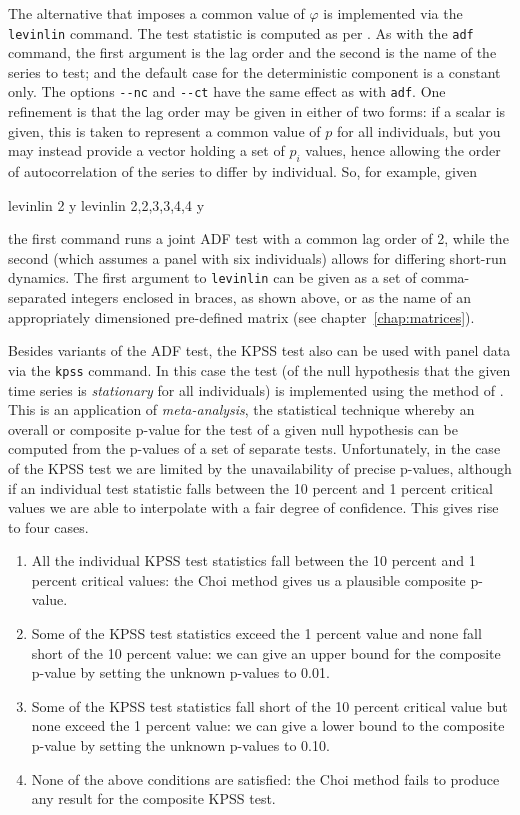The alternative that imposes a common value of $\varphi$ is
implemented via the \texttt{levinlin} command. The test statistic is
computed as per \citet*{LLC2002}.  As with the \texttt{adf} command, the
first argument is the lag order and the second is the name of the
series to test; and the default case for the deterministic component
is a constant only. The options \verb|--nc| and \verb|--ct| have the
same effect as with \texttt{adf}. One refinement is that the lag order
may be given in either of two forms: if a scalar is given, this is
taken to represent a common value of $p$ for all individuals, but you
may instead provide a vector holding a set of $p_i$ values, hence
allowing the order of autocorrelation of the series to differ by
individual. So, for example, given
\begin{code}
levinlin 2 y
levinlin {2,2,3,3,4,4} y
\end{code}
the first command runs a joint ADF test with a common lag order of 2,
while the second (which assumes a panel with six individuals) allows
for differing short-run dynamics. The first argument to
\texttt{levinlin} can be given as a set of comma-separated integers
enclosed in braces, as shown above, or as the name of an appropriately
dimensioned pre-defined matrix (see chapter~\ref{chap:matrices}).

Besides variants of the ADF test, the KPSS test also can be used with
panel data via the \texttt{kpss} command. In this case the test (of
the null hypothesis that the given time series is \emph{stationary}
for all individuals) is implemented using the method of
\cite{choi01}. This is an application of \emph{meta-analysis}, the
statistical technique whereby an overall or composite p-value for the
test of a given null hypothesis can be computed from the p-values of a
set of separate tests. Unfortunately, in the case of the KPSS test we
are limited by the unavailability of precise p-values, although if an
individual test statistic falls between the 10 percent and 1 percent
critical values we are able to interpolate with a fair degree of
confidence. This gives rise to four cases.

\begin{enumerate}
\item All the individual KPSS test statistics fall between the 10
  percent and 1 percent critical values: the Choi method gives us
  a plausible composite p-value.
\item Some of the KPSS test statistics exceed the 1 percent value and
  none fall short of the 10 percent value: we can give an upper bound
  for the composite p-value by setting the unknown p-values to 0.01.
\item Some of the KPSS test statistics fall short of the 10 percent
  critical value but none exceed the 1 percent value: we can give a
  lower bound to the composite p-value by setting the unknown p-values
  to 0.10.
\item None of the above conditions are satisfied: the Choi method
  fails to produce any result for the composite KPSS test.
\end{enumerate}


